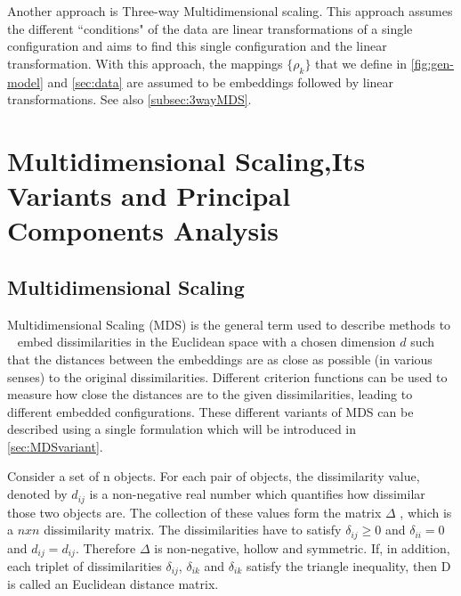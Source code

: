 \documentclass[12pt,oneside,final]{thesis}\usepackage[]{graphicx}\usepackage[]{color}
\begin{document}
Another approach is Three-way Multidimensional scaling\cite{3wayNMDS,borg+groenen:1997}.
 This approach assumes the  different ``conditions" of the data are linear transformations of a single configuration and aims to find this single configuration and the linear transformation. With this approach, the mappings  $\{\rho_k \}$ that we define in \autoref{fig:gen-model} and \autoref{sec:data} are  assumed to be embeddings followed by linear transformations. See also \autoref{subsec:3wayMDS}.




\chapter{Multidimensional Scaling,Its Variants and Principal Components Analysis}
\label{sec:MDS}



\section{Multidimensional Scaling}
Multidimensional Scaling (MDS) is the general term used to describe methods to  ~\cite{CMDS,borg+groenen:1997,duin2005dissimilarity}  embed dissimilarities in the Euclidean space  with a chosen dimension $d$ such that the distances between the embeddings are as close as possible (in various senses) to the original dissimilarities. Different criterion functions can be used to measure how close the distances are  to the given dissimilarities, leading to different embedded configurations. These different variants of MDS can be described using a single formulation which will be introduced in \autoref{sec:MDSvariant}.

Consider a  set of n objects. For each pair of objects, the dissimilarity value, denoted by $d_{ij}$ is a non-negative real number which quantifies how dissimilar those two objects are. The collection of these values form the matrix $\Delta$ , which is  a $nxn$ dissimilarity matrix. %
The dissimilarities have to satisfy $\delta_{ij}\geq 0$ and $\delta_{ii}=0$ and $d_{ij}=d_{ij}$. Therefore  $\Delta$ is non-negative, hollow and symmetric. If, in addition, each triplet of dissimilarities $\delta_{ij}$, $\delta_{ik}$ and $\delta_{ik}$  satisfy the triangle inequality, then D is called  an Euclidean distance matrix.
\end{document}

